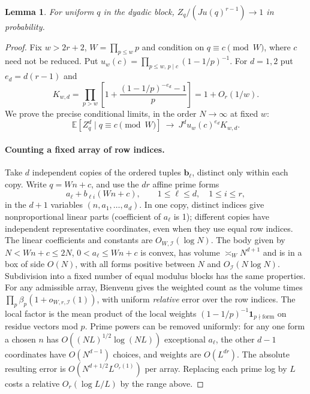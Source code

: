 \documentclass[11pt]{article}
\newtheorem{lemma}{Lemma}
\newcommand{\E}{\mathbb E}
\newcommand{\1}{\mathbf{1}}
\begin{document}
\begin{lemma}\label{lem:integer}
For uniform $q$ in the dyadic block, $Z_q/(J u(q)^{r-1})\to1$ in probability.
\end{lemma}
\begin{proof}
Fix $w>2r+2$, $W=\prod_{p\le w}p$ and condition on $q\equiv c\pmod W$, where $c$ need not be reduced. Put $u_w(c)=\prod_{p\le w,\,p\mid c}(1-1/p)^{-1}$. For $d=1,2$ put $e_d=d(r-1)$ and
\[
 K_{w,d}=\prod_{p>w}\left[1+\frac{(1-1/p)^{-e_d}-1}{p}\right]=1+O_r(1/w).
\]
We prove the precise conditional limits, in the order $N\to\infty$ at fixed $w$:
\[
 \E[Z_q^d\mid q\equiv c\pmod W]\ \longrightarrow\ J^d u_w(c)^{e_d}K_{w,d}.\tag{1}
\]

\paragraph{Counting a fixed array of row indices.}
Take $d$ independent copies of the ordered tuples $\mathbf b_\ell$, distinct only within each copy. Write $q=Wn+c$, and use the $dr$ affine prime forms
\[
 a_\ell+b_{\ell i}(Wn+c),\qquad 1\le\ell\le d,\quad 1\le i\le r,
\]
in the $d+1$ variables $(n,a_1,\ldots,a_d)$. In one copy, distinct indices give nonproportional linear parts (coefficient of $a_\ell$ is 1); different copies have independent representative coordinates, even when they use equal row indices. The linear coefficients and constants are $O_{W,\mathcal I}(\log N)$. The body given by $N<Wn+c\le2N$, $0<a_\ell\le Wn+c$ is convex, has volume $\asymp_W N^{d+1}$ and is in a box of side $O(N)$, with all forms positive between $N$ and $O_{\mathcal I}(N\log N)$. Subdivision into a fixed number of equal modulus blocks has the same properties. For any admissible array, Bienvenu \cite[Thm.~1.3]{bien} gives the weighted count as the volume times $\prod_p\beta_p(1+o_{W,r,\mathcal I}(1))$, with uniform \emph{relative} error over the row indices. The local factor is the mean product of the local weights $(1-1/p)^{-1}\1_{p\nmid\text{form}}$ on residue vectors mod $p$. Prime powers can be removed uniformly: for any one form a chosen $n$ has $O((NL)^{1/2}\log(NL))$ exceptional $a_\ell$, the other $d-1$ coordinates have $O(N^{d-1})$ choices, and weights are $O(L^{dr})$. The absolute resulting error is $O(N^{d+1/2}L^{O_r(1)})$ per array. Replacing each prime log by $L$ costs a relative $O_r(\log L/L)$ by the range above.

\end{proof}
\end{document}

